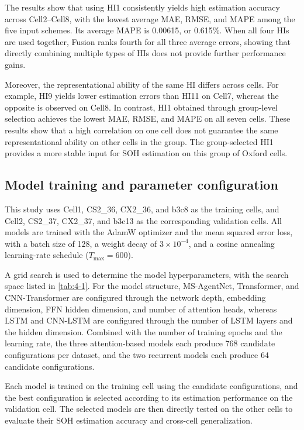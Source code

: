 The results show that using HI1 consistently yields high estimation accuracy across Cell2--Cell8, with the lowest average MAE, RMSE, and MAPE among the five input schemes. Its average MAPE is 0.00615, or 0.615\%. When all four HIs are used together, Fusion ranks fourth for all three average errors, showing that directly combining multiple types of HIs does not provide further performance gains.

Moreover, the representational ability of the same HI differs across cells. For example, HI9 yields lower estimation errors than HI11 on Cell7, whereas the opposite is observed on Cell8. In contrast, HI1 obtained through group-level selection achieves the lowest MAE, RMSE, and MAPE on all seven cells. These results show that a high correlation on one cell does not guarantee the same representational ability on other cells in the group. The group-selected HI1 provides a more stable input for SOH estimation on this group of Oxford cells.

\FloatBarrier

\subsection{Model training and parameter configuration}

This study uses Cell1, CS2\_36, CX2\_36, and b3c8 as the training cells, and Cell2, CS2\_37, CX2\_37, and b3c13 as the corresponding validation cells. All models are trained with the AdamW optimizer and the mean squared error loss, with a batch size of 128, a weight decay of $3\times10^{-4}$, and a cosine annealing learning-rate schedule ($T_{\max}=600$).

A grid search is used to determine the model hyperparameters, with the search space listed in \cref{tab:4-1}. For the model structure, MS-AgentNet, Transformer, and CNN-Transformer are configured through the network depth, embedding dimension, FFN hidden dimension, and number of attention heads, whereas LSTM and CNN-LSTM are configured through the number of LSTM layers and the hidden dimension. Combined with the number of training epochs and the learning rate, the three attention-based models each produce 768 candidate configurations per dataset, and the two recurrent models each produce 64 candidate configurations.


\FloatBarrier

Each model is trained on the training cell using the candidate configurations, and the best configuration is selected according to its estimation performance on the validation cell. The selected models are then directly tested on the other cells to evaluate their SOH estimation accuracy and cross-cell generalization.

